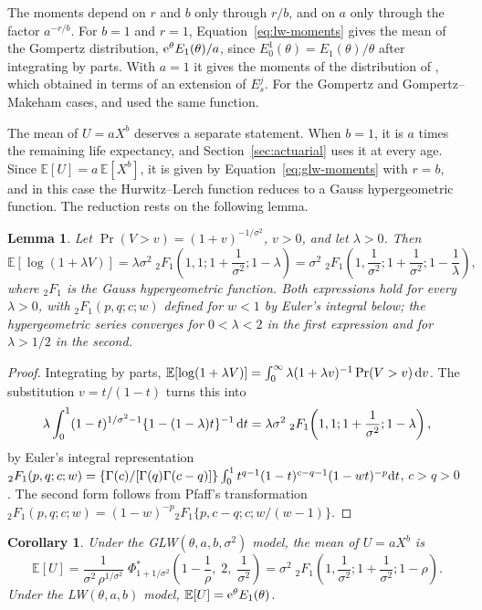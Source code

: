 \documentclass[12pt]{article}
\newcommand{\E}{\mathbb{E}}       %
\newcommand{\e}{{\rm e}}         %
\newcommand{\dd}{{\rm d}}        %
\newtheorem{corollary}{Corollary}
\newtheorem{lemma}{Lemma}
\begin{document}
The moments depend on $r$ and $b$ only through $r/b$, and on $a$ only through the factor $a^{-r/b}$. For $b=1$ and $r=1$, Equation~\eqref{eq:lw-moments} gives the mean of the Gompertz distribution, $\e^\theta E_1(\theta)/a$, since $E_0^1(\theta)=E_1(\theta)/\theta$ after integrating by parts. With $a=1$ it gives the moments of the distribution of \citet{chen2000new}, which \citet{pogany2017extension} obtained in terms of an extension of $E_s^j$. For the Gompertz and Gompertz--Makeham cases, \citet{lenart2014moments} and \citet{castellares2022gompertz} used the same function.

The mean of $U=aX^b$ deserves a separate statement. When $b=1$, it is $a$ times the remaining life expectancy, and Section~\ref{sec:actuarial} uses it at every age. Since $\E[U]=a\,\E[X^b]$, it is given by Equation~\eqref{eq:glw-moments} with $r=b$, and in this case the Hurwitz--Lerch function reduces to a Gauss hypergeometric function. The reduction rests on the following lemma.

\begin{lemma}\label{lem:log}
Let $\Pr(V>v)=(1+v)^{-1/\sigma^2}$, $v>0$, and let $\lambda>0$. Then
\[
\E[\log(1+\lambda V)]=\lambda\sigma^2\;{}_2F_1\!\left(1,1;1+\frac1{\sigma^2};1-\lambda\right)=\sigma^2\;{}_2F_1\!\left(1,\frac1{\sigma^2};1+\frac1{\sigma^2};1-\frac1\lambda\right),
\]
where ${}_2F_1$ is the Gauss hypergeometric function. Both expressions hold for every $\lambda>0$, with ${}_2F_1(p,q;c;w)$ defined for $w<1$ by Euler's integral below; the hypergeometric series converges for $0<\lambda<2$ in the first expression and for $\lambda>1/2$ in the second.
\end{lemma}

\begin{proof}
Integrating by parts, $\E[\log(1+\lambda V)]=\int_0^\infty\lambda(1+\lambda v)^{-1}\Pr(V>v)\,\dd v$. The substitution $v=t/(1-t)$ turns this into
\[
\lambda\int_0^1(1-t)^{1/\sigma^2-1}\{1-(1-\lambda)t\}^{-1}\,\dd t=\lambda\sigma^2\;{}_2F_1\!\left(1,1;1+\frac1{\sigma^2};1-\lambda\right),
\]
by Euler's integral representation ${}_2F_1(p,q;c;w)=\{\Gamma(c)/[\Gamma(q)\Gamma(c-q)]\}\int_0^1t^{q-1}(1-t)^{c-q-1}(1-wt)^{-p}\dd t$, $c>q>0$ \citep[Chapter~9]{lebedev1965special}. The second form follows from Pfaff's transformation ${}_2F_1(p,q;c;w)=(1-w)^{-p}{}_2F_1\{p,c-q;c;w/(w-1)\}$.
\end{proof}

\begin{corollary}\label{cor:EU}
Under the GLW$(\theta,a,b,\sigma^2)$ model, the mean of $U=aX^b$ is
\begin{equation}\label{eq:EU}
\E[U]=\frac{1}{\sigma^2\,\rho^{1/\sigma^2}}\;\Phi^\ast_{1+1/\sigma^2}\!\left(1-\frac1\rho,\;2,\;\frac1{\sigma^2}\right)=\sigma^2\;{}_2F_1\!\left(1,\frac1{\sigma^2};1+\frac1{\sigma^2};1-\rho\right).
\end{equation}
Under the LW$(\theta,a,b)$ model, $\E[U]=\e^\theta E_1(\theta)$.
\end{corollary}
\end{document}

